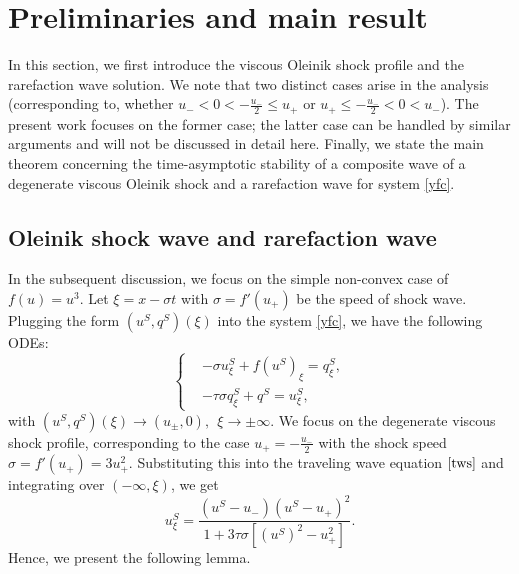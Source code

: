 \documentclass[10pt,reqno]{amsart}
\numberwithin{equation}{section}
\begin{document}
	
	\section{Preliminaries and main result}\label{sec2}
	In this section, we first introduce the viscous Oleinik shock profile and the rarefaction wave solution. We note that two distinct cases arise in the analysis (corresponding to, whether $u_{-}<0<-\frac{u_{-}}{2}\leq u_{+}$ or $u_{+}\leq -\frac{u_{-}}{2}<0<u_{-}$). The present work focuses on the former case; the latter case can be handled by similar arguments and will not be discussed in detail here. Finally, we state the main theorem concerning the time-asymptotic stability of a composite wave of a degenerate viscous Oleinik shock and a rarefaction wave for system \eqref{yfc}.
	
	\subsection{Oleinik shock wave and rarefaction wave}
	In the subsequent discussion, we focus on the simple non-convex case of $f(u)=u^3$. Let $\xi=x-\sigma t$ with $\sigma=f'(u_{+})$ be the speed of shock wave. Plugging the form $(u^S,q^S)(\xi)$ into the system \eqref{yfc}, we have the following ODEs:
	\begin{equation}\label{tws} %
		\left\{ \begin{aligned}
			&-\sigma u_{\xi}^{S}+f(u^{S})_{\xi}=q_{\xi}^{S}, \\
			&-\tau\sigma q_{\xi}^{S}+q^{S}=u_{\xi}^{S} ,
		\end{aligned}\right.
	\end{equation}
	with $(u^{S},q^{S})(\xi)\to (u_{\pm},0),\ \ \xi\to \pm\infty.$
	We focus on the degenerate viscous shock profile, corresponding to the case $u_{+}=-\frac{u_{-}}{2}$ with the shock speed $\sigma=f'(u_{+})=3u_{+}^{2}.$  Substituting this into the traveling wave equation $\eqref{tws}$ and integrating over $(-\infty,\xi)$, we get
	\begin{equation}\label{1S}
		u_{\xi}^{S}=\frac{(u^{S}-u_{-})(u^{S}-u_{+})^{2}}{1+3\tau \sigma\left[(u^{S})^{2}-u_{+}^{2}\right]}.
	\end{equation}
	Hence, we present the following lemma.
\end{document}
